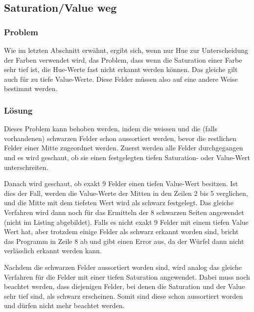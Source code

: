 \documentclass[a4paper, 12pt]{article}
\begin{document}
\subsection{Saturation/Value weg}
\subsubsection{Problem}
Wie im letzten Abschnitt erwähnt, ergibt sich, wenn nur Hue zur Unterscheidung der Farben verwendet wird, das Problem, dass wenn die Saturation einer Farbe sehr tief ist, die Hue-Werte fast nicht erkannt werden können. Das gleiche gilt auch für zu tiefe Value-Werte. Diese Felder müssen also auf eine andere Weise bestimmt werden. 
\subsubsection{Lösung}
Dieses Problem kann behoben werden, indem die weissen und die (falls vorhandenen) schwarzen Felder schon aussortiert werden, bevor die restlichen Felder einer Mitte zugeordnet werden. Zuerst werden alle Felder durchgegangen und es wird geschaut, ob sie einen festgelegten tiefen Saturation- oder Value-Wert unterschreiten.

Danach wird geschaut, ob exakt 9 Felder einen tiefen Value-Wert besitzen. Ist dies der Fall, werden die Value-Werte der Mitten in den Zeilen 2 bis 5 verglichen, und die Mitte mit dem tiefsten Wert wird als schwarz festgelegt. Das gleiche Verfahren wird dann noch für das Ermitteln der 8 schwarzen Seiten angewendet (nicht im Listing abgebildet). Falls es nicht exakt 9 Felder mit einem tiefen Value Wert hat, aber trotzdem einige Felder als schwarz erkannt worden sind, bricht das Programm in Zeile 8 ab und gibt einen Error aus, da der Würfel dann nicht verlässlich erkannt werden kann. 

 Nachdem die schwarzen Felder aussortiert worden sind, wird analog das gleiche Verfahren für die Felder mit einer tiefen Saturation angewendet. Dabei muss noch beachtet werden, dass diejenigen Felder, bei denen die Saturation und der Value sehr tief sind, als schwarz erscheinen. Somit sind diese schon aussortiert worden und dürfen nicht mehr beachtet werden. 
\end{document}
